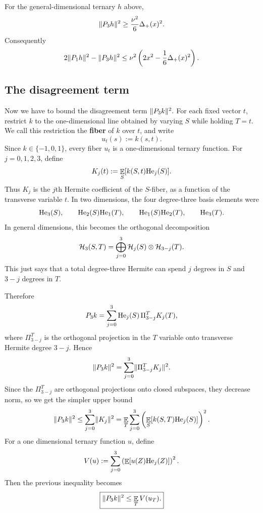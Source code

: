 \begin{corollary}
For the general-dimensional ternary $h$ above,
\[
        \lVert P_3h\rVert^2\ge \frac{\nu^2}{6}\Delta_+(x)^2.
\]
Consequently
\[
        2\lVert P_1h\rVert^2-\lVert P_3h\rVert^2
        \le
        \nu^2\left(2x^2-\frac16\Delta_+(x)^2\right).
\]
\end{corollary}

\subsection{The disagreement term}
\label{sec:disagreement}

Now we have to bound the disagreement term
\(
        \lVert P_3k\rVert^2.
\)
For each fixed vector \(t\), restrict \(k\) to the one-dimensional line obtained by varying \(S\) while holding \(T=t\). We call this restriction the \textbf{fiber} of \(k\) over \(t\), and write
\[
    u_t(s):=k(s,t).
\]
Since \(k\in\{-1,0,1\}\), every fiber \(u_t\) is a one-dimensional ternary function. For $j=0,1,2,3$, define
\[
        K_j(t):=\mathop{\mathbb{E}}_S[k(S,t)\mathrm{He}_j(S)].
\]
Thus $K_j$ is the $j$th Hermite coefficient of the $S$-fiber, as a function of the transverse variable $t$. In two dimensions, the four degree-three basis elements were
\[
        \mathrm{He}_3(S),\qquad
        \mathrm{He}_2(S)\mathrm{He}_1(T),\qquad
        \mathrm{He}_1(S)\mathrm{He}_2(T),\qquad
        \mathrm{He}_3(T).
\]
In general dimensions, this becomes the orthogonal decomposition
\[
        \mathcal H_3(S,T)
        =\bigoplus_{j=0}^3 \mathcal H_j(S)\otimes \mathcal H_{3-j}(T).
\]
This just says that a total degree-three Hermite can spend $j$ degrees in $S$ and $3-j$ degrees in $T$.

Therefore
\[
        P_3k
        =\sum_{j=0}^3 \mathrm{He}_j(S)\,\Pi^T_{3-j}K_j(T),
\]
where $\Pi^T_{3-j}$ is the orthogonal projection in the $T$ variable onto transverse Hermite degree $3-j$. Hence
\begin{equation}
        \lVert P_3k\rVert^2
        =\sum_{j=0}^3 \lVert\Pi^T_{3-j}K_j\rVert^2.
        \label{eq:p3k-decomposition}
\end{equation}
Since the $\Pi^T_{3-j}$ are orthogonal projections onto closed subspaces, they decrease norm, so we get the simpler upper bound
\[
        \lVert P_3k\rVert^2
        \le \sum_{j=0}^3\lVert K_j\rVert^2
        =\mathop{\mathbb{E}}_T\sum_{j=0}^3\left(\mathop{\mathbb{E}}_S[k(S,T)\mathrm{He}_j(S)]\right)^2.
\]
For a one dimensional ternary function $u$, define
\[
        V(u):=\sum_{j=0}^3\left(\mathop{\mathbb{E}}[u(Z)\mathrm{He}_j(Z)]\right)^2.
\]
Then the previous inequality becomes
\begin{equation}
        \boxed{\lVert P_3k\rVert^2\le \mathop{\mathbb{E}}_T V(u_T).}
        \label{eq:p3k-fiber-bound}
\end{equation}

